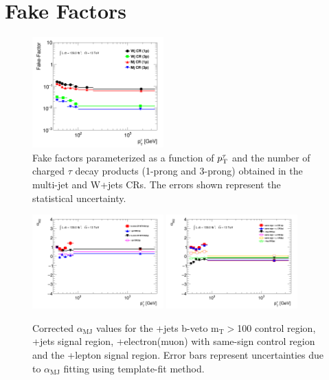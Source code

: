 \chapter{Fake Factors}\label{app:fake-factors}

	\begin{figure}[!thp]
	\begin{center}
	\includegraphics[width=0.45\textwidth]{chapters/chapter6_HPlus/images/FFs/FFs_inclusive_tracks_pT_FFsCR.png}
	\end{center}
	\caption{ Fake factors parameterized as a function of $p_{\text{T}}^{\tau}$ and the number of charged $\tau$ decay products (1-prong and 3-prong) obtained in the multi-jet and W+jets CRs. The errors shown represent the statistical uncertainty. 
	}
	\label{fig:bkg-FF-CR}
	\end{figure}

	\begin{figure}[h!]
	\begin{center}
	\includegraphics[width=0.45\textwidth]{chapters/chapter6_HPlus/images/FFs/ALPHA_inclusive__taujet.png} \qquad
	\includegraphics[width=0.45\textwidth]{chapters/chapter6_HPlus/images/FFs/ALPHA_inclusive__taulep.png} 
	\end{center}
	\caption{
	Corrected $\alpha_\mathrm{MJ}$ values for the \tauhad+jets b-veto $\mathrm{m_{T}}>$100 control region, \tauhad+jets signal region, \tauhad+electron(muon) with same-sign control region and the \tauhad+lepton signal region. Error bars represent uncertainties due to $\alpha_\mathrm{MJ}$ fitting using template-fit method. 
	}
	\label{fig:rQCD}
	\end{figure}

